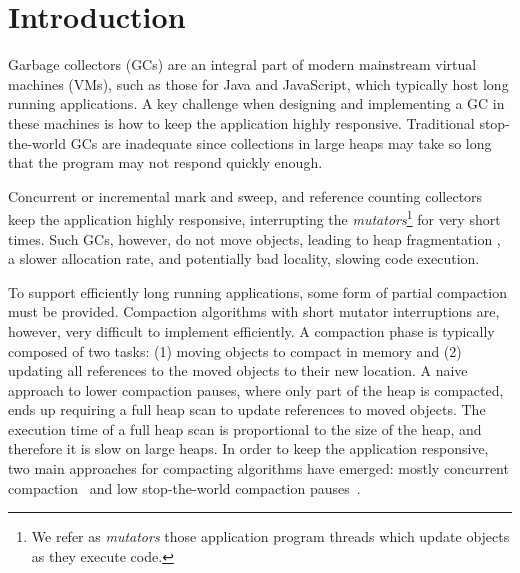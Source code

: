 \documentclass[sigplan,10pt,screen]{acmart}\settopmatter{printfolios=true,printccs=true,printacmref=true}
\newcommand{\egb}[1]{\color{blue}\fbox{\bfseries\sffamily\scriptsize Elisa:}{\sf\small$\blacktriangleright$\textit{#1}$\blacktriangleleft$}\color{black}}
\begin{document}
\section{Introduction}

Garbage collectors (GCs) are an integral part of  modern mainstream virtual machines (VMs), such as those for Java and JavaScript, which typically host long running applications.
A key challenge when designing and implementing a GC in these machines is how to keep the application highly responsive.
Traditional stop-the-world GCs are inadequate since collections in large heaps may take so long that the program may not respond quickly enough.

Concurrent or incremental mark and sweep, and reference counting collectors \cite{ConcNonMovingGC,ConcNonMovingGC2,CMSGC,ConcRefCount} keep the application highly responsive, interrupting the \emph{mutators}\footnote{We refer as \emph{mutators} those application program threads which update objects as they execute code.} for very short times. Such GCs, however, do not move objects, leading to heap fragmentation \cite{GCHandBookFrag}, a slower allocation rate, and potentially bad locality, slowing code execution. 

To support efficiently long running applications, some form of partial compaction must be provided.
Compaction algorithms with short mutator interruptions are, however, very difficult to implement efficiently. A compaction phase is typically composed of two tasks: (1) moving objects to compact in memory and (2) updating all references to the moved objects to their new location. A naive approach to lower compaction pauses, where only part of the heap is compacted, ends up requiring a full heap scan to update references to moved objects. The execution time of a full heap scan is proportional to the size of the heap, and therefore it is slow on large heaps. 
In order to keep the application responsive, two main approaches for compacting algorithms have emerged: mostly concurrent compaction~\cite{AzulVirtualMemConcCompact,IBMConcCompact,AzulHardwareReadBarrierConcCompact,Shenandoah,MetronomeIBMGC,RTConcCompactGC,RTGCBrooksReadBarrier} and low stop-the-world compaction pauses~\cite{G1,VirtualMemConcCompact}.
\end{document}
